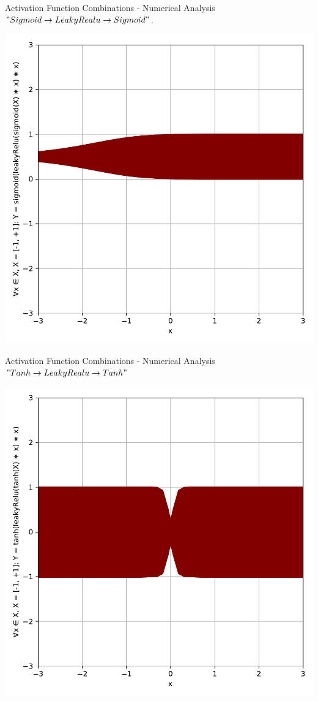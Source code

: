\documentclass{beamer}
\begin{document}
		\begin{frame}{Activation Function Combinations - Numerical Analysis}
			$" Sigmoid \rightarrow LeakyRealu \rightarrow Sigmoid "$.
			\begin{center}
				\includegraphics[height=0.88\textheight]{sigmoid_leakyRelu_sigmoid}
			\end{center}
		\end{frame}
		\begin{frame}{Activation Function Combinations - Numerical Analysis}
			$" Tanh \rightarrow LeakyRealu \rightarrow Tanh "$
			\begin{center}
				\includegraphics[height=0.88\textheight]{tanh_leakyRelu_tanh}
			\end{center}
		\end{frame}
\end{document}
